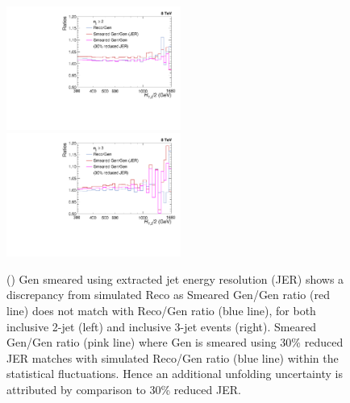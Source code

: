 \begin{figure}[!htbp]
 \begin{center}
 \hspace*{-5mm}\includegraphics[width=0.51\textwidth]{Plots_HT_2_150/Ratio_Reco_2_crystal.pdf}%
 ~~\includegraphics[width=0.51\textwidth]{Plots_HT_2_150/Ratio_Reco_3_crystal.pdf}
 \caption{\MadGraphF \plus \PYTHIAS (\MGP) Gen smeared using extracted jet energy resolution (JER) shows a discrepancy from simulated Reco as Smeared Gen/Gen ratio (red line) does not match with Reco/Gen ratio (blue line), for both inclusive 2-jet (left) and inclusive 3-jet events (right). Smeared Gen/Gen ratio (pink line) where Gen is smeared using 30\% reduced JER matches with simulated Reco/Gen ratio (blue line) within the statistical fluctuations. Hence an additional unfolding uncertainty is attributed by comparison to 30\% reduced JER.}
 \label{fig:ratios}
 \end{center}
\end{figure}

